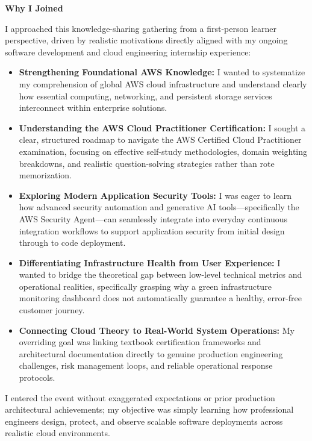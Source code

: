 \vspace{0.5em}\noindent\textbf{Why I Joined}\par

I approached this knowledge-sharing gathering from a first-person
learner perspective, driven by realistic motivations directly aligned
with my ongoing software development and cloud engineering internship
experience:

\begin{itemize}
\tightlist
\item
  \textbf{Strengthening Foundational AWS Knowledge:} I wanted to
  systematize my comprehension of global AWS cloud infrastructure and
  understand clearly how essential computing, networking, and persistent
  storage services interconnect within enterprise solutions.
\item
  \textbf{Understanding the AWS Cloud Practitioner Certification:} I
  sought a clear, structured roadmap to navigate the AWS Certified Cloud
  Practitioner examination, focusing on effective self-study
  methodologies, domain weighting breakdowns, and realistic
  question-solving strategies rather than rote memorization.
\item
  \textbf{Exploring Modern Application Security Tools:} I was eager to
  learn how advanced security automation and generative AI
  tools---specifically the AWS Security Agent---can seamlessly integrate
  into everyday continuous integration workflows to support application
  security from initial design through to code deployment.
\item
  \textbf{Differentiating Infrastructure Health from User Experience:} I
  wanted to bridge the theoretical gap between low-level technical
  metrics and operational realities, specifically grasping why a green
  infrastructure monitoring dashboard does not automatically guarantee a
  healthy, error-free customer journey.
\item
  \textbf{Connecting Cloud Theory to Real-World System Operations:} My
  overriding goal was linking textbook certification frameworks and
  architectural documentation directly to genuine production engineering
  challenges, risk management loops, and reliable operational response
  protocols.
\end{itemize}

I entered the event without exaggerated expectations or prior production
architectural achievements; my objective was simply learning how
professional engineers design, protect, and observe scalable software
deployments across realistic cloud environments.

